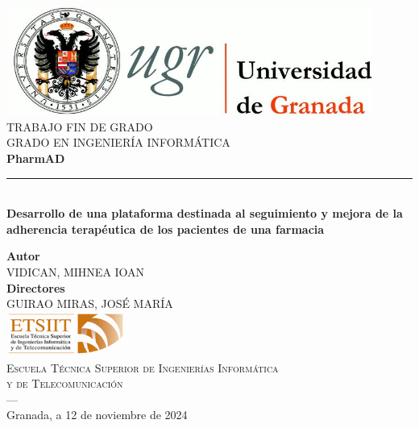 \begin{titlepage}
 
 
\newlength{\centeroffset}
\setlength{\centeroffset}{-0.5\oddsidemargin}
\addtolength{\centeroffset}{0.5\evensidemargin}
\thispagestyle{empty}

\noindent\hspace*{\centeroffset}\begin{minipage}{\textwidth}

\centering
\includegraphics[width=0.9\textwidth]{imagenes/logo_ugr.jpg}\\[1.4cm]

\textsc{ \Large TRABAJO FIN DE GRADO\\[0.2cm]}
\textsc{ GRADO EN INGENIERÍA INFORMÁTICA}\\[1cm]
% 
{\Huge\bfseries PharmAD\\
}
\noindent\rule[-1ex]{\textwidth}{3pt}\\[3.5ex]
{\large\bfseries Desarrollo de una plataforma destinada al seguimiento y mejora de la adherencia terapéutica de los pacientes de una farmacia}
\end{minipage}

\vspace{2.5cm}
\noindent\hspace*{\centeroffset}\begin{minipage}{\textwidth}
\centering

\textbf{Autor}\\ {VIDICAN, MIHNEA IOAN}\\[2.5ex]
\textbf{Directores}\\
{GUIRAO MIRAS, JOSÉ MARÍA}\\[2cm]
\includegraphics[width=0.3\textwidth]{imagenes/etsiit_logo.png}\\[0.1cm]
\textsc{Escuela Técnica Superior de Ingenierías Informática \\ y de Telecomunicación}\\
\textsc{---}\\
Granada, a 12 de noviembre de 2024
\end{minipage}
\end{titlepage}



